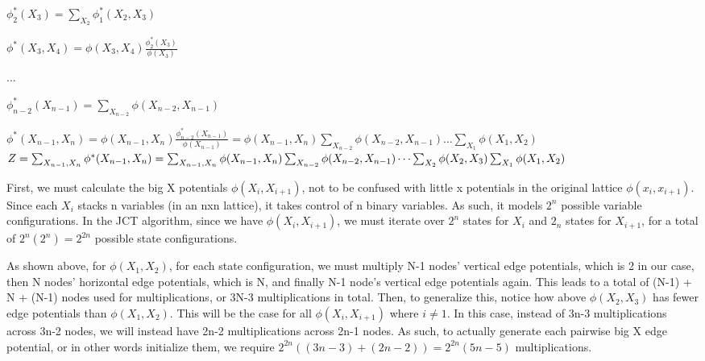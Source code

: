 \documentclass[12pt]{article}
\begin{document}
$\phi_2^*(X_3) = \sum_{X_2} \phi_1^*(X_2, X_3)$

$\phi^*(X_3, X_4) = \phi(X_3, X_4)\frac{\phi_2^*(X_3)}{\phi(X_3)}$

$\dots$

$\phi_{n-2}^*(X_{n-1}) = \sum_{X_{n-2}} \phi(X_{n-2}, X_{n-1})$

$\phi^*(X_{n-1}, X_n) = \phi(X_{n-1}, X_n)\frac{\phi_{n-2}^*(X_{n-1})}{\phi(X_{n-1})} = \phi(X_{n-1}, X_n)\sum_{X_{n-2}} \phi(X_{n-2}, X_{n-1})\dots \sum_{X_1} \phi(X_1, X_2)$\\

$Z = \sum_{X_{n-1}, X_n} \phi^*(X_{n-1}, X_n) \\
= \sum_{X_{n-1}, X_n} \phi(X_{n-1}, X_n)\sum_{X_{n-2}} \phi(X_{n-2}, X_{n-1}) \dots \sum_{X_2} \phi(X_2, X_3)\sum_{X_1} \phi(X_1, X_2)$

First, we must calculate the big X potentials $\phi(X_i, X_{i+1})$, not to be confused with little x potentials in the original lattice $\phi(x_i, x_{i+1})$. Since each $X_i$ stacks n variables (in an nxn lattice), it takes control of n binary variables. As such, it models $2^n$ possible variable configurations. In the JCT algorithm, since we have $\phi(X_i, X_{i+1})$, we must iterate over $2^n$ states for $X_i$ and $2_n$ states for $X_{i+1}$, for a total of $2^n(2^n) = 2^{2n}$ possible state configurations.

As shown above, for $\phi(X_1, X_2)$, for each state configuration, we must multiply N-1 nodes' vertical edge potentials, which is 2 in our case, then N nodes' horizontal edge potentials, which is N, and finally N-1 node's vertical edge potentials again. This leads to a total of (N-1) + N + (N-1) nodes used for multiplications, or 3N-3 multiplications in total. Then, to generalize this, notice how above $\phi(X_2, X_3)$ has fewer edge potentials than $\phi(X_1, X_2)$. This will be the case for all $\phi(X_i, X_{i+1})$ where $i \neq 1$. In this case, instead of 3n-3 multiplications across 3n-2 nodes, we will instead have 2n-2 multiplications across 2n-1 nodes. As such, to actually generate each pairwise big X edge potential, or in other words initialize them, we require $2^{2n}((3n-3) + (2n-2)) = 2^{2n}(5n-5)$ multiplications.
\end{document}
